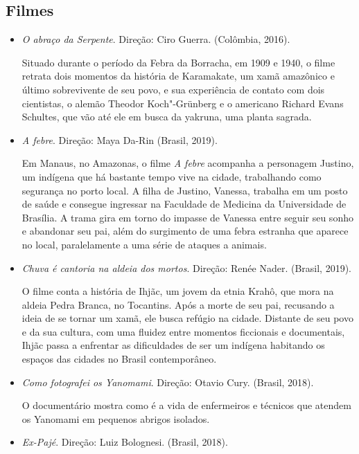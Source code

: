 \documentclass[12pt]{extarticle}
\begin{document}
\subsection{Filmes}

\begin{itemize}
\item \textit{O abraço da Serpente}. Direção: Ciro Guerra. (Colômbia, 2016).

Situado durante o período da Febra da Borracha, em 1909 e 1940, o filme 
retrata dois momentos da história de Karamakate, um xamã amazônico e último 
sobrevivente de seu povo, e sua experiência de contato com dois cientistas, 
o alemão Theodor Koch"-Grünberg e o americano Richard Evans Schultes, que 
vão até ele em busca da yakruna, uma planta sagrada. 

\item \textit{A febre}. Direção: Maya Da-Rin (Brasil, 2019).

Em Manaus, no Amazonas, o filme \emph{A febre} acompanha a personagem Justino, um
indígena que há bastante tempo vive na cidade, trabalhando como segurança no 
porto local. A filha de Justino, Vanessa, trabalha em um posto de saúde e consegue 
ingressar na Faculdade de Medicina da Universidade de Brasília. 
A trama gira em torno do impasse de Vanessa entre seguir seu sonho e abandonar seu pai, além 
do surgimento de uma febra estranha que aparece no local, paralelamente a uma 
série de ataques a animais.

\item \textit{Chuva é cantoria na aldeia dos mortos}. Direção: Renée Nader. (Brasil, 2019).

O filme conta a história de Ihjãc, um jovem da etnia Krahô, que mora na aldeia Pedra 
Branca, no Tocantins. Após a morte de seu pai, recusando a ideia de se tornar um xamã, 
ele busca refúgio na cidade. Distante de seu povo e da sua cultura, com uma fluidez 
entre momentos ficcionais e documentais, Ihjãc passa a enfrentar as dificuldades de 
ser um indígena habitando os espaços das cidades no Brasil contemporâneo.

\item \textit{Como fotografei os Yanomami}. Direção: Otavio Cury. (Brasil,
2018).

O documentário mostra como é a vida de enfermeiros e técnicos que
atendem os Yanomami em pequenos abrigos isolados.

\item \textit{Ex-Pajé}. Direção: Luiz Bolognesi. (Brasil, 2018).


\end{itemize}
\end{document}
